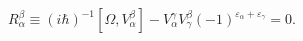 \begin{equation}
R_{\alpha}^{\beta}\equiv(i\hbar)^{-1}[\Omega,V_{\alpha}^{\beta}]-
V_{\alpha}^{\gamma}V_{\gamma}^\beta
(-1)^{\varepsilon_{\alpha}+\varepsilon_{\gamma}}=0.\label{3.4}%
\end{equation}

